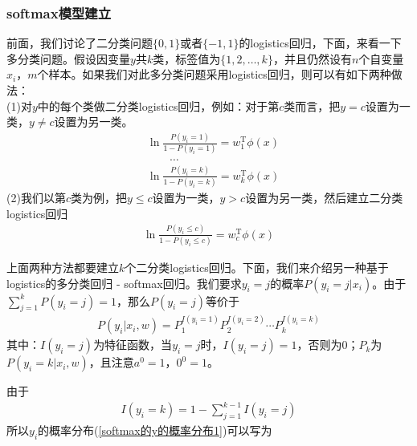         \subsubsection{softmax模型建立}
            \par
            前面，我们讨论了二分类问题$\{0,1\}$或者$\{-1,1\}$的logistics回归，下面，来看一下多分类问题。假设因变量$y$共$k$类，标签值为$\{1,2,\dots,k\}$，并且仍然设有$n$个自变量$x_i$，$m$个样本。如果我们对此多分类问题采用logistics回归，则可以有如下两种做法：\\
            (1)对$y$中的每个类做二分类logistics回归，例如：对于第$c$类而言，把$y = c$设置为一类，$y \neq c$设置为另一类。
            \begin{align*}
            & \ln \frac{P(y_i=1)}{1-P(y_i = 1)} = w_1^\mathrm{T}\phi(x)\\
            & \qquad \dots\\
            & \ln \frac{P(y_i=k)}{1-P(y_i = k)} = w_k^\mathrm{T}\phi(x)
            \end{align*}
            (2)我们以第$c$类为例，把$y \leqslant c$设置为一类，$y>c$设置为另一类，然后建立二分类logistics回归
            \begin{align*}
            \ln \frac{P(y_i \leqslant c)}{1-P(y_i \leqslant c)} = w_c^\mathrm{T}\phi(x)
            \end{align*}
            \par
            上面两种方法都要建立$k$个二分类logistics回归。下面，我们来介绍另一种基于logistics的多分类回归 - softmax回归。我们要求$y_i = j$的概率$P(y_i = j|x_i)$。由于$\sum\limits_{j=1}^k P(y_i = j) = 1$，那么$P(y_i = j)$等价于
            \begin{align}
            \label{softmax的y的概率分布1}
            P(y_i|x_i,w) = P_1^{I(y_i=1)}P_2^{I(y_i=2)}\cdots P_k^{I(y_i=k)}
            \end{align}
            其中：$I(y_i=j)$为特征函数，当$y_i=j$时，$I(y_i=j)=1$，否则为0；$P_k$为$P(y_i=k|x_i,w)$，且注意$a^0=1$，$0^0=1$。
            \par
            由于
            \begin{align*}
            I(y_i=k) = 1-\sum_{j=1}^{k-1}I(y_i=j)
            \end{align*}
            所以$y_i$的概率分布(\ref{softmax的y的概率分布1})可以写为
